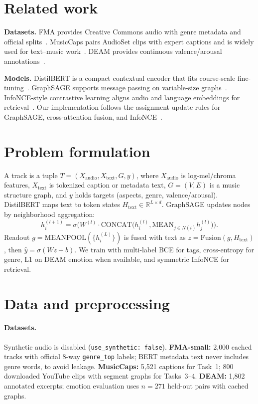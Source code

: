 \documentclass{article}
\begin{document}
\section{Related work}
\label{sec:related}

\textbf{Datasets.}
FMA provides Creative Commons audio with genre metadata and official splits~\cite{fma}.
MusicCaps pairs AudioSet clips with expert captions and is widely used for text--music work~\cite{musiccaps}.
DEAM provides continuous valence/arousal annotations~\cite{deam}.

\textbf{Models.}
DistilBERT is a compact contextual encoder that fits course-scale fine-tuning~\cite{distilbert}.
GraphSAGE supports message passing on variable-size graphs~\cite{graphsage}.
InfoNCE-style contrastive learning aligns audio and language embeddings for retrieval~\cite{musiccaps,assign}.
Our implementation follows the assignment update rules for GraphSAGE, cross-attention fusion, and InfoNCE~\cite{assign}.

\section{Problem formulation}
\label{sec:problem}

A track is a tuple $T=(X_{\mathrm{audio}},X_{\mathrm{text}},G,y)$, where $X_{\mathrm{audio}}$ is log-mel/chroma features, $X_{\mathrm{text}}$ is tokenized caption or metadata text, $G=(V,E)$ is a music structure graph, and $y$ holds targets (aspects, genre, valence/arousal).
DistilBERT maps text to token states $H_{\mathrm{text}}\in\mathbb{R}^{L\times d}$.
GraphSAGE updates nodes by neighborhood aggregation:
\begin{equation}
h_i^{(l+1)}=\sigma\Big(W^{(l)}\cdot\mathrm{CONCAT}\big(h_i^{(l)},\mathrm{MEAN}_{j\in N(i)}h_j^{(l)}\big)\Big).
\end{equation}
Readout $g=\mathrm{MEANPOOL}(\{h_i^{(L)}\})$ is fused with text as $z=\mathrm{Fusion}(g,H_{\mathrm{text}})$, then $\hat y=\sigma(Wz+b)$.
We train with multi-label BCE for tags, cross-entropy for genre, L1 on DEAM emotion when available, and symmetric InfoNCE for retrieval.

\section{Data and preprocessing}
\label{sec:data}

\paragraph{Datasets.}
Synthetic audio is disabled (\texttt{use\_synthetic: false}).
\textbf{FMA-small:} 2{,}000 cached tracks with official 8-way \texttt{genre\_top} labels; BERT metadata text never includes genre words, to avoid leakage.
\textbf{MusicCaps:} 5{,}521 captions for Task~1; 800 downloaded YouTube clips with segment graphs for Tasks~3--4.
\textbf{DEAM:} 1{,}802 annotated excerpts; emotion evaluation uses $n{=}271$ held-out pairs with cached graphs.
\end{document}

